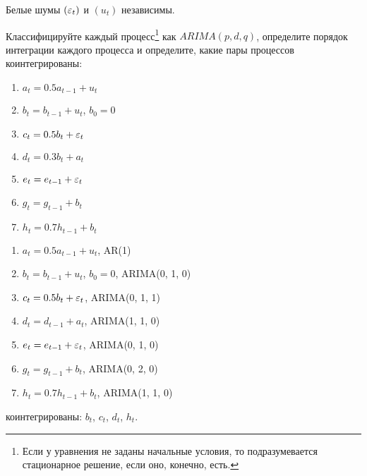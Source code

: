 \begin{problem}
Белые шумы $(\varepsilon_t)$ и $(u_t)$ независимы.

Классифицируйте каждый процесс\footnote{Если у уравнения не заданы начальные условия, то подразумевается стационарное решение, если оно, конечно, есть.} как $ARIMA(p, d, q)$, определите порядок интеграции каждого процесса и определите, какие пары процессов коинтегрированы:
\begin{enumerate}
  \item $a_t = 0.5 a_{t-1} + u_t$
  \item $b_t = b_{t-1} + u_t$, $b_0 = 0$
  \item $c_t = 0.5 b_t + \varepsilon_t$
  \item $d_t = 0.3 b_t + a_t$
  \item $e_t = e_{t-1} + \varepsilon_t$
  \item $g_t = g_{t-1} + b_t$
  \item $h_t = 0.7 h_{t-1} + b_t$
\end{enumerate}

\begin{sol}
  \begin{enumerate}
    \item $a_t = 0.5 a_{t-1} + u_t$, AR(1)
    \item $b_t = b_{t-1} + u_t$, $b_0 = 0$, ARIMA(0, 1, 0)
    \item $c_t = 0.5 b_t + \varepsilon_t$, ARIMA(0, 1, 1)
    \item $d_t = d_{t-1} + a_t$, ARIMA(1, 1, 0)
    \item $e_t = e_{t-1} + \varepsilon_t$, ARIMA(0, 1, 0)
    \item $g_t = g_{t-1} + b_t$, ARIMA(0, 2, 0)
    \item $h_t = 0.7 h_{t-1} + b_t$, ARIMA(1, 1, 0)
  \end{enumerate}
  коинтегрированы: $b_t$, $c_t$, $d_t$, $h_t$.
\end{sol}
\end{problem}

